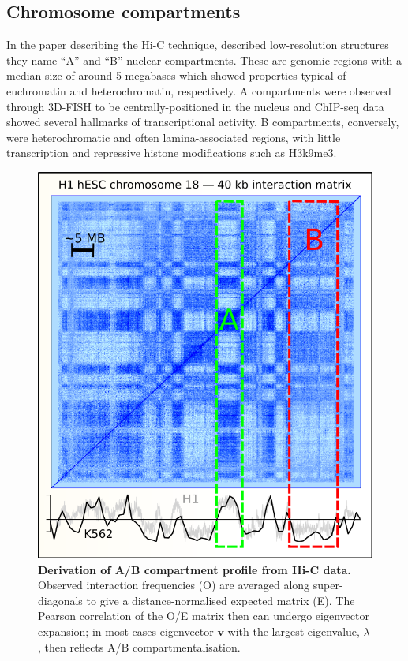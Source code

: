 \documentclass[a4paper,11pt,oneside]{book}
\begin{document}

\subsection{Chromosome compartments}\label{sec:compartments}

In the paper describing the Hi-C technique, \citet{Lieberman2009} described low-resolution structures they name  ``A'' and ``B'' nuclear compartments. These are genomic regions with a median size of around 5 megabases which showed properties typical
of euchromatin and heterochromatin, respectively. A compartments were observed through 3D-FISH to be centrally-positioned in the nucleus and  ChIP-seq data showed several hallmarks of transcriptional activity. B compartments, conversely, were heterochromatic and often lamina-associated regions, with little transcription and repressive histone modifications such as H3k9me3.\cite{Lieberman2009, DeWit2012} 

\begin{figure}
\begin{center}
\includegraphics[width=.75\textwidth]{figs/eigcalc.png}
\captionsetup{width=\textwidth}
\caption[Derivation of A/B compartment profile from Hi-C data.]{ {\bf Derivation of A/B compartment profile from Hi-C data.} 
Observed interaction frequencies (O) are averaged along super-diagonals to give a distance-normalised expected matrix (E). The Pearson correlation of the O/E matrix then can undergo eigenvector expansion; in most cases eigenvector $\mathbf{v}$ with the largest eigenvalue, $\lambda$, then reflects A/B compartmentalisation.\cite{Lieberman2009}
}\label{fig:eigcalc}
\end{center}
\end{figure} 
\end{document}
